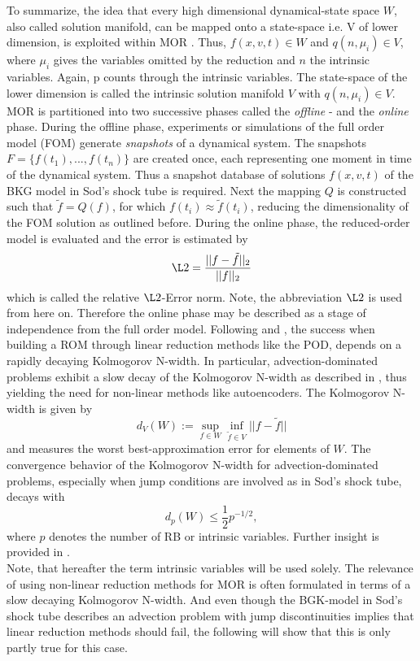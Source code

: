 To summarize, the idea that every high dimensional dynamical-state space \(W\), also called solution
manifold, can be mapped onto a state-space i.e. V of lower dimension, is exploited within MOR \cite{ohlberger2015reduced}. Thus, \(f(x, v, t) \in W\) and \(q(n,\mu_i) \in V\), where \(\mu_i\) gives the variables omitted by the reduction and \(n\) the intrinsic variables. Again, p counts through the intrinsic variables. The state-space of the lower dimension is called the intrinsic solution manifold \(V\) with \(q(n, \mu_i) \in V\)\cite{Carlberg}.
MOR is partitioned into two successive phases called the \textit{offline} - and the \textit{online} phase. During the offline phase, experiments or simulations of the full order model (FOM) generate \textit{snapshots} of a dynamical system. The snapshots \(F = \{f(t_1),...,f(t_n)\}\) are created once, each representing one moment in time of the dynamical system. Thus a snapshot database of solutions \(f(x,v,t)\) of the BKG model in Sod's shock tube is required. Next the mapping \(Q\) is constructed such that \(\tilde{f} = Q(f)\), for which \(f(t_i) \approx \tilde{f}(t_i)\), reducing the dimensionality of the FOM solution as outlined before. During the online phase, the reduced-order model is evaluated and the error is estimated by
\begin{equation}
	\L2 = \frac{||f - \tilde{f} ||_2}{||f||_2}
\end{equation}
which is called the relative \(\L2\)-Error norm. Note, the abbreviation \(\L2\) is used from here on. Therefore the online phase may be described as a stage of independence from the full order model. Following \cite{ohlberger2015reduced} and \cite{Carlberg}, the success when building a ROM through linear reduction methods like the POD, depends on a rapidly decaying Kolmogorov N-width. In particular, advection-dominated problems exhibit a slow decay of the Kolmogorov N-width as described in \cite{ohlberger2015reduced}, thus yielding the need for non-linear methods like autoencoders. The Kolmogorov N-width is given by
\begin{equation}
	d_{V}(W):= \sup_{f \in W} \inf_{\tilde{f} \in V} ||f-\tilde{f}||
	\label{Eq:Kolmogorov}
\end{equation}
and measures the worst best-approximation error for elements of \(W\). The convergence behavior of the Kolmogorov N-width for advection-dominated problems, especially when jump conditions are involved as in Sod's shock tube, decays with
\begin{equation}
	d_p(W) \leq \frac{1}{2} p^{-1/2},
	\label{Eq:KolmoAdv}
\end{equation}
where \(p\) denotes the number of RB or intrinsic variables. Further insight is provided in \cite{ohlberger2015reduced}.\\
Note, that hereafter the term intrinsic variables will be used solely. The relevance of using non-linear reduction methods for MOR is often formulated in terms of a slow decaying Kolmogorov N-width. And even though the BGK-model in Sod's shock tube describes an advection problem with jump discontinuities implies that linear reduction methods should fail, the following will show that this is only partly true for this case.


